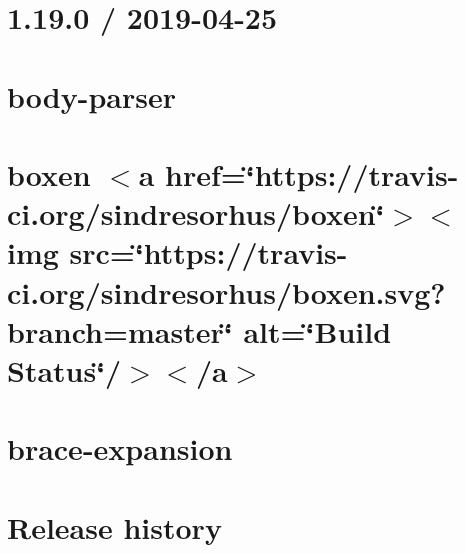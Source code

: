 \let\mypdfximage\pdfximage\def\pdfximage{\immediate\mypdfximage}\documentclass[twoside]{book}
\newcommand{\+}{\discretionary{\mbox{\scriptsize$\hookleftarrow$}}{}{}}
\begin{document}
\chapter{1.19.0 / 2019-\/04-\/25}
\label{md__c_1__git_hub__p_r_o_y_e_c_t_o-_i_i_i-_g_o_t_rest-api-node-mysql_node_modules_body-parser__h_i_s_t_o_r_y}

\chapter{body-\/parser}
\label{md__c_1__git_hub__p_r_o_y_e_c_t_o-_i_i_i-_g_o_t_rest-api-node-mysql_node_modules_body-parser__r_e_a_d_m_e}

\chapter{boxen $<$a href=\char`\"{}https\+://travis-\/ci.\+org/sindresorhus/boxen\char`\"{}$>$$<$img src=\char`\"{}https\+://travis-\/ci.\+org/sindresorhus/boxen.\+svg?branch=master\char`\"{} alt=\char`\"{}\+Build Status\char`\"{}/$>$$<$/a$>$}
\label{md__c_1__git_hub__p_r_o_y_e_c_t_o-_i_i_i-_g_o_t_rest-api-node-mysql_node_modules_boxen_readme}

\chapter{brace-\/expansion}
\label{md__c_1__git_hub__p_r_o_y_e_c_t_o-_i_i_i-_g_o_t_rest-api-node-mysql_node_modules_brace-expansion__r_e_a_d_m_e}

\chapter{Release history}
\label{md__c_1__git_hub__p_r_o_y_e_c_t_o-_i_i_i-_g_o_t_rest-api-node-mysql_node_modules_braces__c_h_a_n_g_e_l_o_g}

\end{document}
